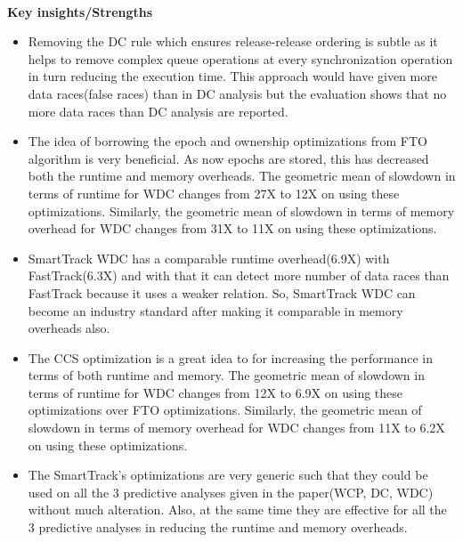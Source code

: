 \documentclass[20pt]{letter}
\begin{document}
\begin{enumerate}
{\textbf{\\Key insights/Strengths}\\
\begin{itemize}
    \item Removing the DC rule which ensures release-release ordering is subtle as it helps to remove complex queue operations at every synchronization operation in turn reducing the execution time. This approach would have given more data races(false races) than in DC analysis but the evaluation shows that no more data races than DC analysis are reported.
    \item The idea of borrowing the epoch and ownership optimizations from FTO algorithm is very beneficial. As now epochs are stored, this has decreased both the runtime and memory overheads. The geometric mean of slowdown in terms of runtime for WDC changes from 27X to 12X on using these optimizations. Similarly, the geometric mean of slowdown in terms of memory overhead for WDC changes from 31X to 11X on using these optimizations. 
    \item SmartTrack WDC has a comparable runtime overhead(6.9X) with FastTrack(6.3X) and with that it can detect more number of data races than FastTrack because it uses a weaker relation. So, SmartTrack WDC can become an industry standard after making it comparable in memory overheads also.
    \item The CCS optimization is a great idea to for increasing the performance in terms of both runtime and memory. The geometric mean of slowdown in terms of runtime for WDC changes from 12X to 6.9X on using these optimizations over FTO optimizations. Similarly, the geometric mean of slowdown in terms of memory overhead for WDC changes from 11X to 6.2X on using these optimizations. 
    \item The SmartTrack's optimizations are very generic such that they could be used on all the 3 predictive analyses given in the paper(WCP, DC, WDC) without much alteration. Also, at the same time they are effective for all the 3 predictive analyses in reducing the runtime and memory overheads.
\end{itemize}

}
\end{enumerate}
\end{document}

